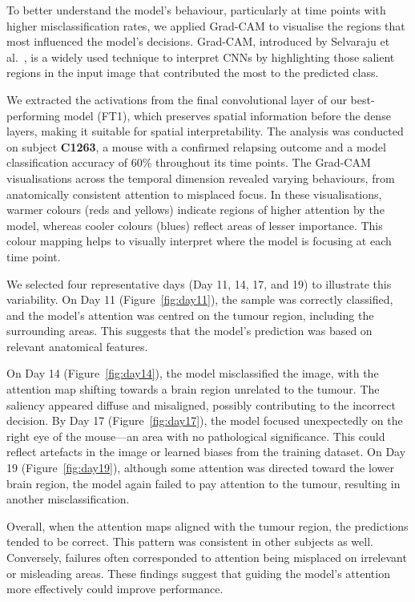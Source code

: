 \documentclass[12pt, a4paper]{report}
\begin{document}
To better understand the model’s behaviour, particularly at time points with higher misclassification rates, we applied Grad-CAM to visualise the regions that most influenced the model’s decisions. Grad-CAM, introduced by Selvaraju et al.~\cite{selvaraju2017gradcam}, is a widely used technique to interpret CNNs by highlighting those salient regions in the input image that contributed the most to the predicted class.

We extracted the activations from the final convolutional layer of our best-performing model (FT1), which preserves spatial information before the dense layers, making it suitable for spatial interpretability. The analysis was conducted on subject \textbf{C1263}, a mouse with a confirmed relapsing outcome and a model classification accuracy of 60\% throughout its time points. The Grad-CAM visualisations across the temporal dimension revealed varying behaviours, from anatomically consistent attention to misplaced focus. In these visualisations, warmer colours (reds and yellows) indicate regions of higher attention by the model, whereas cooler colours (blues) reflect areas of lesser importance. This colour mapping helps to visually interpret where the model is focusing at each time point.

We selected four representative days (Day 11, 14, 17, and 19) to illustrate this variability. On Day 11 (Figure~\ref{fig:day11}), the sample was correctly classified, and the model’s attention was centred on the tumour region, including the surrounding areas. This suggests that the model’s prediction was based on relevant anatomical features.

On Day 14 (Figure~\ref{fig:day14}), the model misclassified the image, with the attention map shifting towards a brain region unrelated to the tumour. The saliency appeared diffuse and misaligned, possibly contributing to the incorrect decision. By Day 17 (Figure~\ref{fig:day17}), the model focused unexpectedly on the right eye of the mouse—an area with no pathological significance. This could reflect artefacts in the image or learned biases from the training dataset. On Day 19 (Figure~\ref{fig:day19}), although some attention was directed toward the lower brain region, the model again failed to pay attention to the tumour, resulting in another misclassification.

Overall, when the attention maps aligned with the tumour region, the predictions tended to be correct. This pattern was consistent in other subjects as well. Conversely, failures often corresponded to attention being misplaced on irrelevant or misleading areas. These findings suggest that guiding the model’s attention more effectively could improve performance.
\end{document}
